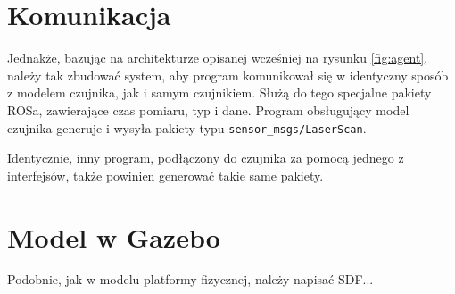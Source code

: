 \section{Komunikacja}
Jednakże, bazując na architekturze opisanej wcześniej na rysunku \ref{fig:agent}, należy tak zbudować system, aby program komunikował się w identyczny sposób z 
modelem czujnika, jak i samym czujnikiem.
Służą do tego specjalne pakiety ROSa, zawierające czas pomiaru, typ i dane.
Program obsługujący model czujnika generuje i wysyła pakiety typu \texttt{sensor\_msgs/LaserScan}.

Identycznie, inny program, podłączony do czujnika za pomocą jednego z interfejsów, także powinien generować takie same pakiety.

\section{Model w Gazebo}
Podobnie, jak w modelu platformy fizycznej, należy napisać SDF...
